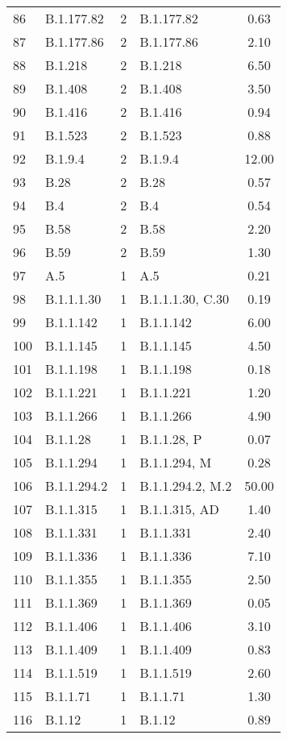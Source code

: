 \begin{longtable}{llcp{4cm}c}
  86 & B.1.177.82 &   2 & B.1.177.82 & 0.63 \\ 
  87 & B.1.177.86 &   2 & B.1.177.86 & 2.10 \\ 
  88 & B.1.218 &   2 & B.1.218 & 6.50 \\ 
  89 & B.1.408 &   2 & B.1.408 & 3.50 \\ 
  90 & B.1.416 &   2 & B.1.416 & 0.94 \\ 
  91 & B.1.523 &   2 & B.1.523 & 0.88 \\ 
  92 & B.1.9.4 &   2 & B.1.9.4 & 12.00 \\ 
  93 & B.28 &   2 & B.28 & 0.57 \\ 
  94 & B.4 &   2 & B.4 & 0.54 \\ 
  95 & B.58 &   2 & B.58 & 2.20 \\ 
  96 & B.59 &   2 & B.59 & 1.30 \\ 
  97 & A.5 &   1 & A.5 & 0.21 \\ 
  98 & B.1.1.1.30 &   1 & B.1.1.1.30, C.30 & 0.19 \\ 
  99 & B.1.1.142 &   1 & B.1.1.142 & 6.00 \\ 
  100 & B.1.1.145 &   1 & B.1.1.145 & 4.50 \\ 
  101 & B.1.1.198 &   1 & B.1.1.198 & 0.18 \\ 
  102 & B.1.1.221 &   1 & B.1.1.221 & 1.20 \\ 
  103 & B.1.1.266 &   1 & B.1.1.266 & 4.90 \\ 
  104 & B.1.1.28 &   1 & B.1.1.28, P & 0.07 \\ 
  105 & B.1.1.294 &   1 & B.1.1.294, M & 0.28 \\ 
  106 & B.1.1.294.2 &   1 & B.1.1.294.2, M.2 & 50.00 \\ 
  107 & B.1.1.315 &   1 & B.1.1.315, AD & 1.40 \\ 
  108 & B.1.1.331 &   1 & B.1.1.331 & 2.40 \\ 
  109 & B.1.1.336 &   1 & B.1.1.336 & 7.10 \\ 
  110 & B.1.1.355 &   1 & B.1.1.355 & 2.50 \\ 
  111 & B.1.1.369 &   1 & B.1.1.369 & 0.05 \\ 
  112 & B.1.1.406 &   1 & B.1.1.406 & 3.10 \\ 
  113 & B.1.1.409 &   1 & B.1.1.409 & 0.83 \\ 
  114 & B.1.1.519 &   1 & B.1.1.519 & 2.60 \\ 
  115 & B.1.1.71 &   1 & B.1.1.71 & 1.30 \\ 
  116 & B.1.12 &   1 & B.1.12 & 0.89 \\ 

\end{longtable}
